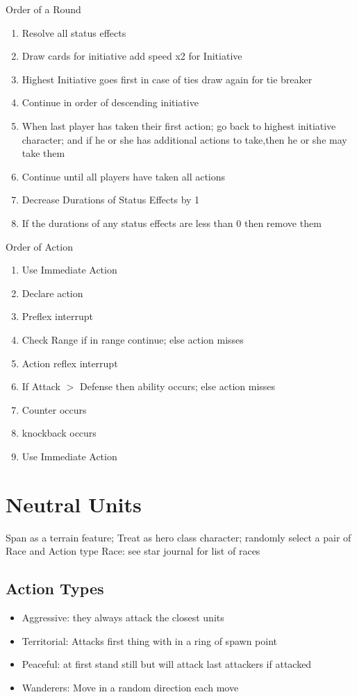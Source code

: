 Order of a Round
\begin{enumerate}
	\item Resolve all status effects 
	\item Draw cards for initiative add speed x2 for Initiative
	\item Highest Initiative goes first in case of ties draw again for tie breaker
	\item Continue in order of descending initiative
	\item When last player has taken their first action; go back to highest initiative character; and if he or she has additional actions to take,then he or she may take them
	\item Continue until all players have taken all actions
	\item Decrease Durations of Status Effects by 1
	\item If the durations of any status effects are less than 0 then remove them
\end{enumerate} 

Order of Action
\begin{enumerate}
	\item Use Immediate Action
	\item Declare action
	\item Preflex interrupt
	\item Check Range if in range continue; else action misses
	\item Action reflex interrupt
	\item If Attack $>$ Defense then ability occurs; else action misses
	\item Counter occurs
	\item knockback occurs
	\item Use Immediate Action
\end{enumerate}

\section{Neutral Units}
Span as a terrain feature; Treat as hero class character; randomly select a pair of Race and Action type
Race: see star journal for list of races

\subsection{Action Types}
\begin{itemize}
\item Aggressive: they always attack the closest units
\item Territorial: Attacks first thing with in a ring of spawn point
\item Peaceful: at first stand still but will attack last attackers if attacked
\item Wanderers: Move in a random direction each move
\end{itemize}

